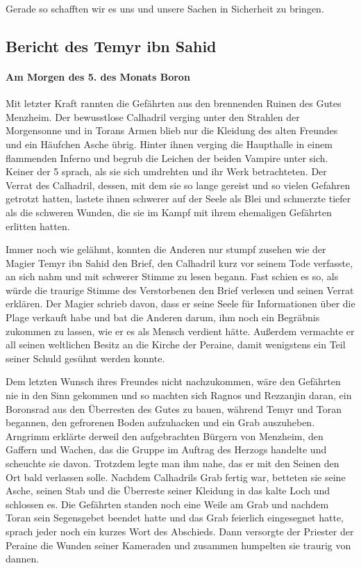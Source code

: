 Gerade so schafften wir es uns und unsere Sachen in Sicherheit zu bringen. 


\subsection{Bericht des Temyr ibn Sahid}

\paragraph{Am Morgen des 5. des Monats Boron}
Mit letzter Kraft rannten die Gefährten aus den brennenden Ruinen des Gutes Menzheim. Der bewusstlose Calhadril verging unter den Strahlen der Morgensonne und in Torans Armen blieb nur die Kleidung des alten Freundes und ein Häufchen Asche übrig. Hinter ihnen verging die Haupthalle in einem flammenden Inferno und begrub die Leichen der beiden Vampire unter sich. Keiner der 5 sprach, als sie sich umdrehten und ihr Werk betrachteten. Der Verrat des Calhadril, dessen, mit dem sie so lange gereist und so vielen Gefahren getrotzt hatten, lastete ihnen schwerer auf der Seele als Blei und schmerzte tiefer als die schweren Wunden, die sie im Kampf mit ihrem ehemaligen Gefährten erlitten hatten.

Immer noch wie gelähmt, konnten die Anderen nur stumpf zusehen wie der Magier Temyr ibn Sahid den Brief, den Calhadril kurz vor seinem Tode verfasste, an sich nahm und mit schwerer Stimme zu lesen begann. Fast schien es so, als würde die traurige Stimme des Verstorbenen den Brief verlesen und seinen Verrat erklären. Der Magier schrieb davon, dass er seine Seele für Informationen über die Plage verkauft habe und bat die Anderen darum, ihm noch ein Begräbnis zukommen zu lassen, wie er es als Mensch verdient hätte. Außerdem vermachte er all seinen weltlichen Besitz an die Kirche der Peraine, damit wenigstens ein Teil seiner Schuld gesühnt werden konnte.

Dem letzten Wunsch ihres Freundes nicht nachzukommen, wäre den Gefährten nie in den Sinn gekommen und so machten sich Ragnos und Rezzanjin daran, ein Boronsrad aus den Überresten des Gutes zu bauen, während Temyr und Toran begannen, den gefrorenen Boden aufzuhacken und ein Grab auszuheben. Arngrimm erklärte derweil den aufgebrachten Bürgern von Menzheim, den Gaffern und Wachen, das die Gruppe im Auftrag des Herzogs handelte und scheuchte sie davon. Trotzdem legte man ihm nahe, das er mit den Seinen den Ort bald verlassen solle. Nachdem Calhadrils Grab fertig war, betteten sie seine Asche, seinen Stab und die Überreste seiner Kleidung in das kalte Loch und schlossen es. Die Gefährten standen noch eine Weile am Grab und nachdem Toran sein Segensgebet beendet hatte und das Grab feierlich eingesegnet hatte, sprach jeder noch ein kurzes Wort des Abschieds. Dann versorgte der Priester der Peraine die Wunden seiner Kameraden und zusammen humpelten sie traurig von dannen.

